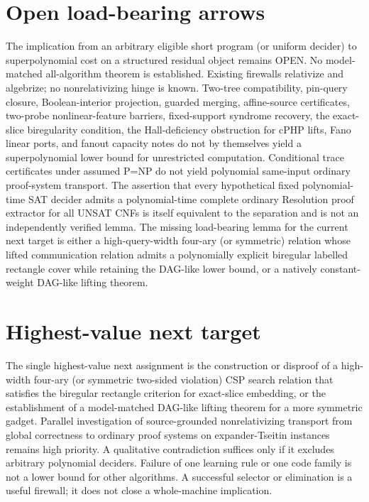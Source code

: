 \documentclass[11pt]{article}
\begin{document}
\section{Open load-bearing arrows}
The implication from an arbitrary eligible short program (or uniform decider) to superpolynomial cost on a structured residual object remains OPEN. No model-matched all-algorithm theorem is established. Existing firewalls relativize and algebrize; no nonrelativizing hinge is known. Two-tree compatibility, pin-query closure, Boolean-interior projection, guarded merging, affine-source certificates, two-probe nonlinear-feature barriers, fixed-support syndrome recovery, the exact-slice biregularity condition, the Hall-deficiency obstruction for cPHP lifts, Fano linear ports, and fanout capacity notes do not by themselves yield a superpolynomial lower bound for unrestricted computation. Conditional trace certificates under assumed P=NP do not yield polynomial same-input ordinary proof-system transport. The assertion that every hypothetical fixed polynomial-time SAT decider admits a polynomial-time complete ordinary Resolution proof extractor for all UNSAT CNFs is itself equivalent to the separation and is not an independently verified lemma. The missing load-bearing lemma for the current next target is either a high-query-width four-ary (or symmetric) relation whose lifted communication relation admits a polynomially explicit biregular labelled rectangle cover while retaining the DAG-like lower bound, or a natively constant-weight DAG-like lifting theorem.

\section{Highest-value next target}
The single highest-value next assignment is the construction or disproof of a high-width four-ary (or symmetric two-sided violation) CSP search relation that satisfies the biregular rectangle criterion for exact-slice embedding, or the establishment of a model-matched DAG-like lifting theorem for a more symmetric gadget. Parallel investigation of source-grounded nonrelativizing transport from global correctness to ordinary proof systems on expander-Tseitin instances remains high priority. A qualitative contradiction suffices only if it excludes arbitrary polynomial deciders. Failure of one learning rule or one code family is not a lower bound for other algorithms. A successful selector or elimination is a useful firewall; it does not close a whole-machine implication.
\end{document}
